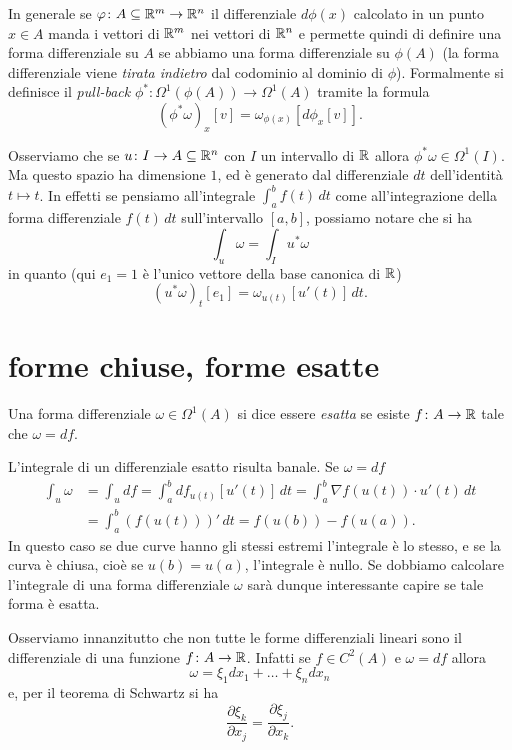 In generale se $\varphi \colon A\subseteq {\mathbb R}^m \to {\mathbb R}^n$ 
il differenziale $d\phi(x)$ calcolato in un punto $x\in A$
manda i vettori di ${\mathbb R}^m$ nei vettori di ${\mathbb R}^n$ 
e permette quindi di definire una forma differenziale su $A$
se abbiamo una forma differenziale su $\phi(A)$
(la forma differenziale viene \emph{tirata indietro} dal codominio al dominio di $\phi$).
Formalmente si definisce il \emph{pull-back}
$\phi^*\colon \Omega^1(\phi(A)) \to \Omega^1(A)$ 
tramite la formula
\[
   (\phi^* \omega)_x[v] = \omega_{\phi(x)}[d\phi_x[v]].
\]

Osserviamo che se $u\colon I\to A\subseteq {\mathbb R}^n$ 
con $I$ un intervallo di ${\mathbb R}$ 
allora $\phi^* \omega \in \Omega^1(I)$. 
Ma questo spazio ha dimensione $1$, ed è generato dal differenziale 
$dt$ dell'identità $t\mapsto t$. 
In effetti se pensiamo all'integrale 
$\int_a^b f(t)\, dt$
come all'integrazione della forma differenziale $f(t)\, dt$ 
sull'intervallo $[a,b]$, possiamo notare che si ha
\[
 \int_u \omega = \int_I u^* \omega
\]
in quanto (qui $e_1=1$ è l'unico vettore della base canonica di ${\mathbb R}$)
\[
  (u^* \omega)_t[e_1] = \omega_{u(t)}[u'(t)]\, dt.
\]

\section{forme chiuse, forme esatte}

\begin{definition}
Una forma differenziale $\omega\in \Omega^1(A)$ si dice essere \emph{esatta}
se esiste $f\colon A\to {\mathbb R}$ tale che $\omega = df$.
\end{definition}

L'integrale di un differenziale esatto risulta banale. Se $\omega = df$
\begin{align*}    
    \int_u \omega 
    &= \int_u df 
    = \int_a^b df_{u(t)}[u'(t)]\, dt 
    = \int_a^b \nabla f(u(t)) \cdot u'(t) \, dt\\
    &= \int_a^b (f(u(t)))' \, dt 
    = f(u(b)) - f(u(a)).
\end{align*}
In questo caso se due curve hanno gli stessi estremi l'integrale è lo stesso,
e se la curva è chiusa, cioè se $u(b) = u(a)$,
l'integrale è nullo. 
Se dobbiamo calcolare l'integrale di una forma differenziale $\omega$ sarà dunque 
interessante capire se tale forma è esatta.

Osserviamo innanzitutto che non tutte le forme differenziali lineari 
sono il differenziale di una funzione $f\colon A\to {\mathbb R}$.
Infatti se $f\in C^2(A)$ e $\omega = df$
allora 
\[
    \omega = \xi_1 dx_1 + \dots + \xi_n dx_n
\]
e, per il teorema di Schwartz si ha 
\begin{equation}\label{eq:forma-chiusa}
  \frac{\partial \xi_k}{\partial x_j} = \frac{\partial \xi_j}{\partial x_k}.
\end{equation}


